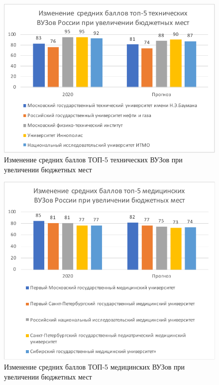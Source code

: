 \begin{figure}[hbtp]
	\centering
	\includegraphics[scale=1.0]{img/top5techup.pdf.pdf}
	\caption{Изменение средних баллов ТОП-5 технических ВУЗов при увеличении бюджетных мест}
	\label{top5techup}
\end{figure} 

\begin{figure}[hbtp]
	\centering
	\includegraphics[scale=1.0]{img/top5medup.pdf.pdf}
	\caption{Изменение средних баллов ТОП-5 медицинских ВУЗов при увеличении бюджетных мест}
	\label{top5medup}
\end{figure} 

